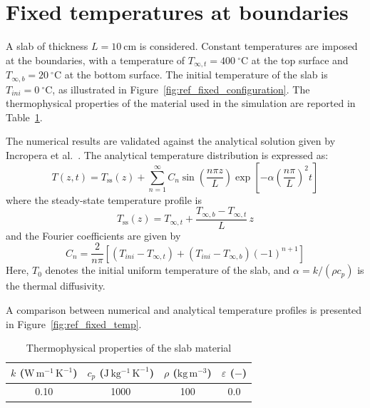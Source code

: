 \documentclass[12pt]{article}
\begin{document}
\fi

\section{Fixed temperatures at boundaries}

A slab of thickness $L = 10~\mathrm{cm}$ is considered. Constant temperatures are imposed at the boundaries, with a temperature of $T_{\infty,t} = 400~^\circ\mathrm{C}$ at the top surface and $T_{\infty,b} = 20~^\circ\mathrm{C}$ at the bottom surface. The initial temperature of the slab is $T_{ini}=0~^\circ\mathrm{C}$, as illustrated in Figure~\ref{fig:ref_fixed_configuration}. The thermophysical properties of the material used in the simulation are reported in Table~\ref{tab:phys_props_fixed}.

The numerical results are validated against the analytical solution given by Incropera et al.~\cite{incropera_fundamentals_2007}. The analytical temperature distribution is expressed as:
\begin{equation}
T(z,t) = T_{\mathrm{ss}}(z) + \sum_{n=1}^{\infty} 
C_n \sin\left( \frac{n \pi z}{L} \right) 
\exp\left[ - \alpha \left( \frac{n \pi}{L} \right)^2 t \right]
\label{eq:T_xt_fixed_bc}
\end{equation}
where the steady-state temperature profile is
\begin{equation}
T_{\mathrm{ss}}(z) = T_{\infty,t} + \frac{T_{\infty,b} - T_{\infty,t}}{L}\, z
\end{equation}
and the Fourier coefficients are given by
\begin{equation}
C_n = \frac{2}{n\pi} 
\left[ 
(T_{ini} - T_{\infty,t}) + (T_{ini} - T_{\infty,b})(-1)^{n+1} 
\right]
\label{eq:Cn}
\end{equation}
Here, $T_0$ denotes the initial uniform temperature of the slab, and $\alpha = k / (\rho c_p)$ is the thermal diffusivity.

 A comparison between numerical and analytical temperature profiles is presented in Figure~\ref{fig:ref_fixed_temp}.

\begin{table}[H]
\centering
\caption{Thermophysical properties of the slab material}
\label{tab:phys_props_fixed}
\renewcommand{\arraystretch}{1.3}
\begin{tabular}{c c c c}
\hline
$k$ ($\mathrm{W\,m^{-1}\,K^{-1}}$) & 
$c_p$ ($\mathrm{J\,kg^{-1}\,K^{-1}}$) & 
$\rho$ ($\mathrm{kg\,m^{-3}}$) & 
$\varepsilon$ ($-$) \\
\hline
0.10 & 1000 & 100 & 0.0 \\
\hline
\end{tabular}
\end{table}
\end{document}
